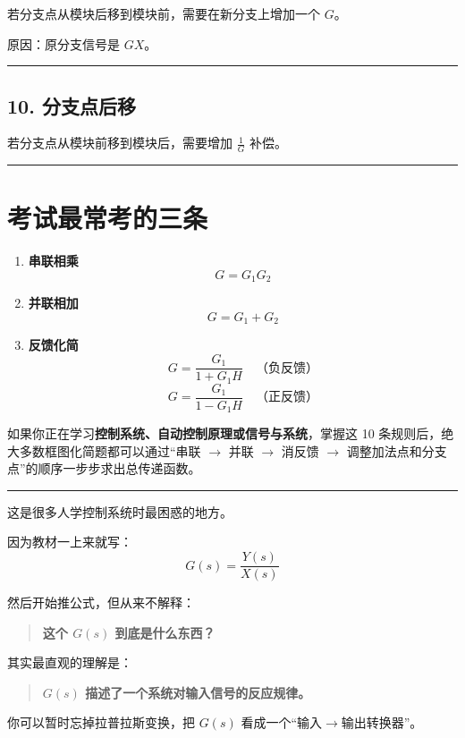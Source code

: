 \documentclass[UTF8,a4paper,11pt]{ctexart}
\begin{document}
若分支点从模块后移到模块前，需要在新分支上增加一个 $G$。

原因：原分支信号是 $GX$。

\bigskip\noindent\rule{\linewidth}{0.4pt}\bigskip

\subsection{10. 分支点后移}

若分支点从模块前移到模块后，需要增加 $\frac{1}{G}$ 补偿。

\bigskip\noindent\rule{\linewidth}{0.4pt}\bigskip

\section{考试最常考的三条}

\begin{enumerate}
  \item \textbf{串联相乘}
  \[
  G=G_1G_2
  \]

  \item \textbf{并联相加}
  \[
  G=G_1+G_2
  \]

  \item \textbf{反馈化简}
  \[
  G=\frac{G_1}{1+G_1H} \quad \text{（负反馈）}
  \]
  \[
  G=\frac{G_1}{1-G_1H} \quad \text{（正反馈）}
  \]
\end{enumerate}

如果你正在学习\textbf{控制系统、自动控制原理或信号与系统}，掌握这 10 条规则后，绝大多数框图化简题都可以通过“串联 $\rightarrow$ 并联 $\rightarrow$ 消反馈 $\rightarrow$ 调整加法点和分支点”的顺序一步步求出总传递函数。

\bigskip\noindent\rule{\linewidth}{0.4pt}\bigskip

这是很多人学控制系统时最困惑的地方。

因为教材一上来就写：
\[
G(s)=\frac{Y(s)}{X(s)}
\]

然后开始推公式，但从来不解释：

\begin{quote}
\textbf{这个 $G(s)$ 到底是什么东西？}
\end{quote}

其实最直观的理解是：

\begin{quote}
\textbf{$G(s)$ 描述了一个系统对输入信号的反应规律。}
\end{quote}

你可以暂时忘掉拉普拉斯变换，把 $G(s)$ 看成一个“输入$\rightarrow$输出转换器”。
\end{document}
